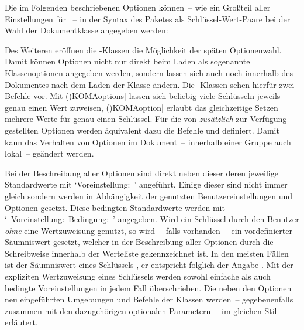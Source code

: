 Die im Folgenden beschriebenen Optionen können~-- wie ein Großteil aller 
Einstellungen für \KOMAScript~-- in der Syntax des Paketes  
als Schlüssel-Wert-Paare bei der Wahl der Dokumentklasse angegeben werden:

Des Weiteren eröffnen die \KOMAScript-Klassen die Möglichkeit der späten 
Optionenwahl. Damit können Optionen nicht nur direkt beim Laden als sogenannte 
Klassenoptionen angegeben werden, sondern lassen sich auch noch innerhalb des 
Dokumentes nach dem Laden der Klasse ändern. Die \KOMAScript-Klassen sehen 
hierfür zwei Befehle vor. Mit 
\Macro(){KOMAoptions|}
lassen sich beliebig viele Schlüsseln jeweils genau einen Wert zuweisen, 
\Macro(){KOMAoption|}
erlaubt das gleichzeitige Setzen mehrere Werte für genau einen Schlüssel. 
Für die von \TUDScript \emph{zusätzlich} zur Verfügung gestellten Optionen
werden äquivalent dazu die Befehle 
und  definiert. 
Damit kann das Verhalten von Optionen im Dokument~-- innerhalb einer Gruppe 
auch lokal~-- geändert werden.

Bei der Beschreibung aller Optionen sind direkt neben dieser deren jeweilige 
Standardwerte mit \mbox{\enquote*{Voreinstellung: }} angeführt. 
Einige dieser sind nicht immer gleich sondern werden in Abhängigkeit der 
genutzten Benutzereinstellungen und Optionen gesetzt. Diese bedingten 
Standardwerte werden mit 
\mbox{\enquote*{%
  Voreinstellung: \txb Bedingung: %
}}
angegeben. Wird ein Schlüssel durch den Benutzer \emph{ohne} eine Wertzuweisung 
genutzt, so wird~-- falls vorhanden~-- ein vordefinierter Säumniswert gesetzt, 
welcher in der Beschreibung aller Optionen durch die~ 
Schreibweise innerhalb der Werteliste gekennzeichnet ist. In den meisten Fällen 
ist der Säumniswert eines Schlüssels , er entspricht folglich der 
Angabe . Mit der expliziten Wertzuweisung eines 
Schlüssels werden sowohl einfache als auch bedingte Voreinstellungen in jedem 
Fall überschrieben. Die neben den Optionen neu eingeführten Umgebungen und 
Befehle der Klassen werden~-- gegebenenfalls zusammen mit den dazugehörigen 
optionalen Parametern~-- im gleichen Stil erläutert.



